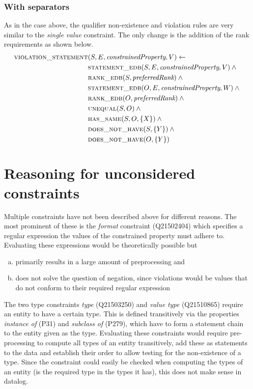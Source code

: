 \documentclass[hyperref,bachelorofscience,fleqn]{cgvpub}
\begin{document}
\subsubsection{With separators}
As in the case above, the qualifier non-existence and violation rules are very similar to the \emph{single value} constraint. The only change is the addition of the rank requirements as shown below.
\begin{align}
\begin{split}
\textsc{violation\_statement}&(S, E, \emph{constrainedProperty}, V) \leftarrow \\
&\textsc{statement\_edb}(S, E, \emph{constrainedProperty}, V) \wedge{} \\
&\textsc{rank\_edb}(S, \emph{preferredRank}) \wedge{} \\
&\textsc{statement\_edb}(O, E, \emph{constrainedProperty}, W) \wedge{} \\
&\textsc{rank\_edb}(O, \emph{preferredRank}) \wedge{} \\
&\textsc{unequal}(S, O) \wedge{} \\
&\textsc{has\_same}(S, O, \{X\}) \wedge{} \\
&\textsc{does\_not\_have}(S, \{Y\}) \wedge{} \\
&\textsc{does\_not\_have}(O, \{Y\})
\end{split}
\end{align}

\section{Reasoning for unconsidered constraints}
Multiple constraints have not been described above for different reasons. The most prominent of these is the \emph{format} constraint (Q21502404) which specifies a regular expression the values of the constrained property must adhere to. Evaluating these expressions would be theoretically possible but \\
\begin{enumerate}[a)]
\item primarily results in a large amount of preprocessing and
\item does not solve the question of negation, since violations would be values that do not conform to their required regular expression
\end{enumerate}

The two type constraints \emph{type} (Q21503250) and \emph{value type} (Q21510865) require an entity to have a certain type. This is defined transitively via the properties \emph{instance of} (P31) and \emph{subclass of} (P279), which have to form a statement chain to the entity given as the type. Evaluating these constraints would require pre-processing to compute all types of an entity transitively, add these as statements to the data and establish their order to allow testing for the non-existence of a type. Since the constraint could easily be checked when computing the types of an entity (is the required type in the types it has), this does not make sense in datalog.
\end{document}
